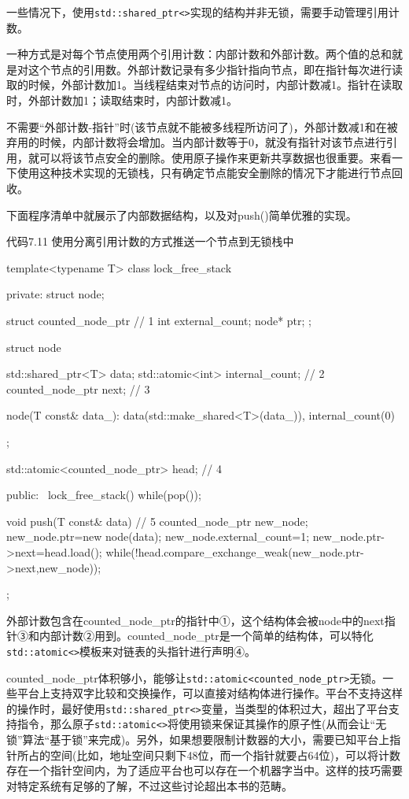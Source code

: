一些情况下，使用\texttt{std::shared\_ptr<>}实现的结构并非无锁，需要手动管理引用计数。

一种方式是对每个节点使用两个引用计数：内部计数和外部计数。两个值的总和就是对这个节点的引用数。外部计数记录有多少指针指向节点，即在指针每次进行读取的时候，外部计数加1。当线程结束对节点的访问时，内部计数减1。指针在读取时，外部计数加1；读取结束时，内部计数减1。

不需要“外部计数-指针”时(该节点就不能被多线程所访问了)，外部计数减1和在被弃用的时候，内部计数将会增加。当内部计数等于0，就没有指针对该节点进行引用，就可以将该节点安全的删除。使用原子操作来更新共享数据也很重要。来看一下使用这种技术实现的无锁栈，只有确定节点能安全删除的情况下才能进行节点回收。

下面程序清单中就展示了内部数据结构，以及对push()简单优雅的实现。

代码7.11 使用分离引用计数的方式推送一个节点到无锁栈中

\begin{cpp}
template<typename T>
class lock_free_stack
{
private:
  struct node;

  struct counted_node_ptr  // 1
  {
    int external_count;
    node* ptr;
  };

  struct node
  {
    std::shared_ptr<T> data;
    std::atomic<int> internal_count;  // 2
    counted_node_ptr next;  // 3

    node(T const& data_):
      data(std::make_shared<T>(data_)),
      internal_count(0)
    {}
  };

  std::atomic<counted_node_ptr> head;  // 4

public:
  ~lock_free_stack()
  {
    while(pop());
  }

  void push(T const& data)  // 5
  {
    counted_node_ptr new_node;
    new_node.ptr=new node(data);
    new_node.external_count=1;
    new_node.ptr->next=head.load();
    while(!head.compare_exchange_weak(new_node.ptr->next,new_node));
  }
};
\end{cpp}

外部计数包含在counted\_node\_ptr的指针中①，这个结构体会被node中的next指针③和内部计数②用到。counted\_node\_ptr是一个简单的结构体，可以特化\texttt{std::atomic<>}模板来对链表的头指针进行声明④。

counted\_node\_ptr体积够小，能够让\texttt{std::atomic<counted\_node\_ptr>}无锁。一些平台上支持双字比较和交换操作，可以直接对结构体进行操作。平台不支持这样的操作时，最好使用\texttt{std::shared\_ptr<>}变量，当类型的体积过大，超出了平台支持指令，那么原子\texttt{std::atomic<>}将使用锁来保证其操作的原子性(从而会让“无锁”算法“基于锁”来完成)。另外，如果想要限制计数器的大小，需要已知平台上指针所占的空间(比如，地址空间只剩下48位，而一个指针就要占64位)，可以将计数存在一个指针空间内，为了适应平台也可以存在一个机器字当中。这样的技巧需要对特定系统有足够的了解，不过这些讨论超出本书的范畴。

